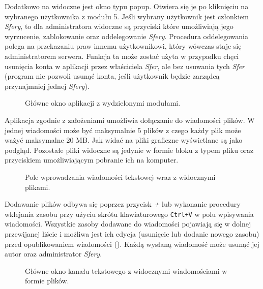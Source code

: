 Dodatkowo na  widoczne jest okno typu popup. Otwiera się je po kliknięciu na wybranego użytkownika
z modułu 5. Jeśli wybrany użytkownik jest członkiem \textit{Sfery}, to dla administratora widoczne są przyciski które
umożliwiają jego wyrzucenie, zablokowanie oraz oddelegowanie \textit{Sfery}. Procedura oddelegowania polega na
przekazaniu praw innemu użytkownikowi, który wówczas staje się administratorem serwera. Funkcja ta może zostać użyta w
przypadku chęci usunięcia konta w aplikacji przez właściciela \textit{Sfer}, ale bez usuwania tych \textit{Sfer}
(program nie pozwoli usunąć konta, jeśli użytkownik będzie zarządcą przynajmniej jednej \textit{Sfery}).
%
\begin{figure}[H]
  \centering
  \caption{Główne okno aplikacji z wydzielonymi modułami.}
  \label{fig:main-view}
\end{figure}


Aplikacja zgodnie z założeniami umożliwia dołączanie do wiadomości plików. W jednej wiadomości może być maksymalnie 5
plików z czego każdy plik może ważyć maksymalne 20 MB. Jak widać na  pliki graficzne wyświetlane
są jako podgląd. Pozostałe pliki widoczne są jedynie w formie bloku z typem pliku oraz przyciskiem umożliwiającym
pobranie ich na komputer.
%
\begin{figure}[H]
  \centering
  \caption{Pole wprowadzania wiadomości tekstowej wraz z widocznymi plikami.}
  \label{fig:append-file}
\end{figure}

Dodawanie plików odbywa się poprzez przycisk \textit{+} lub wykonanie procedury wklejania zasobu przy użyciu skrótu
klawiaturowego \verb|Ctrl+V| w polu wpisywania wiadomości. Wszystkie zasoby dodawane do wiadomości pojawiają się w
dolnej przewijanej liście i możliwa jest ich edycja (usunięcie lub dodanie nowego zasobu) przed opublikowaniem
wiadomości (). Każdą wysłaną wiadomość może usunąć jej autor oraz administrator
\textit{Sfery}.
%
\begin{figure}[H]
  \centering
  \caption{Główne okno kanału tekstowego z widocznymi wiadomościami w formie plików.}
  \label{fig:main-view-files}
\end{figure}

